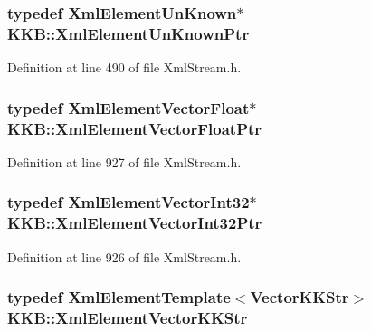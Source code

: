 \subsubsection[{\texorpdfstring{Xml\+Element\+Un\+Known\+Ptr}{XmlElementUnKnownPtr}}]{\setlength{\rightskip}{0pt plus 5cm}typedef {\bf Xml\+Element\+Un\+Known}$\ast$ {\bf K\+K\+B\+::\+Xml\+Element\+Un\+Known\+Ptr}}\hypertarget{namespace_k_k_b_a62dce0bfa7a46d74f12d9f9994983f68}{}\label{namespace_k_k_b_a62dce0bfa7a46d74f12d9f9994983f68}


Definition at line 490 of file Xml\+Stream.\+h.

\subsubsection[{\texorpdfstring{Xml\+Element\+Vector\+Float\+Ptr}{XmlElementVectorFloatPtr}}]{\setlength{\rightskip}{0pt plus 5cm}typedef {\bf Xml\+Element\+Vector\+Float}$\ast$ {\bf K\+K\+B\+::\+Xml\+Element\+Vector\+Float\+Ptr}}\hypertarget{namespace_k_k_b_a350f2154a229f20ab70710645677839d}{}\label{namespace_k_k_b_a350f2154a229f20ab70710645677839d}


Definition at line 927 of file Xml\+Stream.\+h.

\subsubsection[{\texorpdfstring{Xml\+Element\+Vector\+Int32\+Ptr}{XmlElementVectorInt32Ptr}}]{\setlength{\rightskip}{0pt plus 5cm}typedef {\bf Xml\+Element\+Vector\+Int32}$\ast$ {\bf K\+K\+B\+::\+Xml\+Element\+Vector\+Int32\+Ptr}}\hypertarget{namespace_k_k_b_aa7420ba313381c36f725ab01f4c5e312}{}\label{namespace_k_k_b_aa7420ba313381c36f725ab01f4c5e312}


Definition at line 926 of file Xml\+Stream.\+h.

\subsubsection[{\texorpdfstring{Xml\+Element\+Vector\+K\+K\+Str}{XmlElementVectorKKStr}}]{\setlength{\rightskip}{0pt plus 5cm}typedef {\bf Xml\+Element\+Template}$<${\bf Vector\+K\+K\+Str}$>$ {\bf K\+K\+B\+::\+Xml\+Element\+Vector\+K\+K\+Str}}\hypertarget{namespace_k_k_b_ae7f117b12a72568bc7ab4a0322f2c4a4}{}\label{namespace_k_k_b_ae7f117b12a72568bc7ab4a0322f2c4a4}


